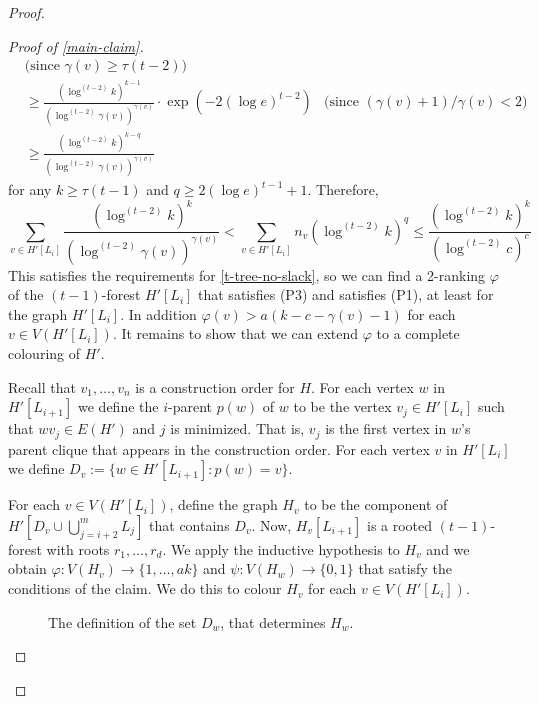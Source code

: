 \documentclass[kpfonts]{patmorin}
\theoremstyle{named}
\begin{document}
\begin{proof}
\begin{proof}[Proof of \cref{main-claim}]
\begin{align*}
                 & \text{(since $\gamma(v)\ge \tau(t-2)$)} \\
             & \ge \frac{
                      (\log^{(t-2)} k)^{k-1}
                      }{
                      \left(\log^{(t-2)}\gamma(v)\right)^{\gamma(v)}
                      }
                      \cdot
                      \exp\left(-2(\log e)^{t-2}\right)
                  & \text{(since $(\gamma(v)+1)/\gamma(v)<2$)} \\
            & \ge \frac{
                     (\log^{(t-2)} k)^{k-q}
                     }{
                     \left(\log^{(t-2)}\gamma(v)\right)^{\gamma(v)}
                     }
       \end{align*}
       for any $k\ge \tau(t-1)$ and $q\ge 2(\log e)^{t-1}+1$.
       Therefore,
       \[
           \sum_{v\in H'[L_i]} \frac{(\log^{(t-2)} k)^k}{(\log^{(t-2)} \gamma(v))^{\gamma(v)}}
           < \sum_{v\in H'[L_i]} n_v(\log^{(t-2)} k)^q
           \le \frac{(\log^{(t-2)} k)^{k}}{(\log^{(t-2)} c)^c}
       \]
       This satisfies the requirements for \cref{t-tree-no-slack}, so we can find a 2-ranking $\varphi$ of the $(t-1)$-forest $H'[L_i]$ that satisfies (P3) and satisfies (P1), at least for the graph $H'[L_i]$. In addition $\varphi(v)> a(k-c-\gamma(v)-1)$ for each $v\in V(H'[L_i])$.  It remains to show that we can extend $\varphi$ to a complete colouring of $H'$.

       Recall that $v_1,\ldots,v_n$ is a construction order for $H$. For each vertex $w$ in $H'[L_{i+1}]$ we define the $i$-parent $p(w)$ of $w$ to be the vertex $v_j\in H'[L_i]$ such that $wv_j\in E(H')$ and $j$ is minimized.  That is, $v_j$ is the first vertex in $w$'s parent clique that appears in the construction order.  For each vertex $v$ in $H'[L_i]$ we define $D_v:=\{w\in H'[L_{i+1}]: p(w)=v\}$.

       For each $v\in V(H'[L_i])$, define the graph $H_v$ to be the component of $H'[D_v\cup \bigcup_{j=i+2}^m L_j]$ that contains $D_v$.
       Now, $H_v[L_{i+1}]$ is a rooted $(t-1)$-forest with roots $r_1,\ldots,r_d$.  We apply the inductive hypothesis to $H_v$ and we obtain $\varphi:V(H_v)\to\{1,\ldots,ak\}$ and $\psi:V(H_w)\to\{0,1\}$ that satisfy the conditions of the claim.  We do this to colour $H_v$ for each $v\in V(H'[L_i])$.

       \begin{figure}
           \caption{The definition of the set $D_w$, that determines $H_w$.}
           \label{subproblems}
       \end{figure}


\end{proof}
\end{proof}
\end{document}
